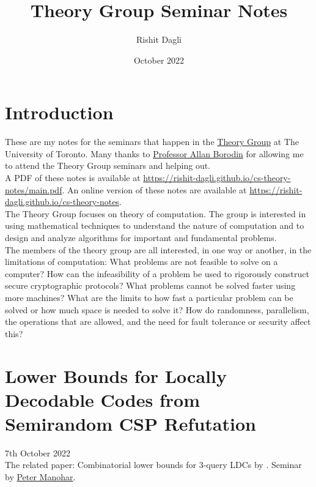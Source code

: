 \documentclass{article}
\title{Theory Group Seminar Notes}
\author{Rishit Dagli}
\date{October 2022}
\begin{document}
\maketitle

\tableofcontents
\clearpage

\section*{Introduction}

These are my notes for the seminars that happen in the \href{https://www.cs.toronto.edu/theory/}{Theory Group} at The University of Toronto. Many thanks to \href{http://www.cs.toronto.edu/~bor/}{Professor Allan Borodin} for allowing me to attend the Theory Group seminars and helping out.\\

A PDF of these notes is available at \url{https://rishit-dagli.github.io/cs-theory-notes/main.pdf}. An online version of these notes are available at \url{https://rishit-dagli.github.io/cs-theory-notes}.\\

The Theory Group focuses on theory of computation. The group is interested in using mathematical techniques to understand the nature of computation and to design and analyze algorithms for important and fundamental problems.\\

The members of the theory group are all interested, in one way or another, in the limitations of computation: What problems are not feasible to solve on a computer? How can the infeasibility of a problem be used to rigorously construct secure cryptographic protocols? What problems cannot be solved faster using more machines? What are the limits to how fast a particular problem can be solved or how much space is needed to solve it? How do randomness, parallelism, the operations that are allowed, and the need for fault tolerance or security affect this?

\newpage

\section{Lower Bounds for Locally Decodable Codes from Semirandom CSP Refutation}

7th October 2022\\

\noindent The related paper: Combinatorial lower bounds for 3-query LDCs by \citet{Alrabiah2022-ds}. Seminar by \href{https://www.cs.cmu.edu/~pmanohar/}{Peter Manohar}. \cite{https://doi.org/10.48550/arxiv.1911.10698}
\end{document}
